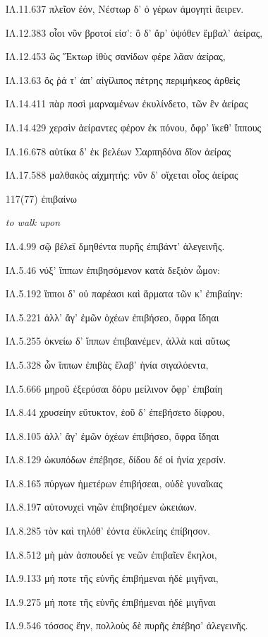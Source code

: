 \begin{enumerate}
{ΙΛ.11.637 πλεῖον ἐόν, Νέστωρ δ' ὁ γέρων ἀμογητὶ ἄειρεν.

ΙΛ.12.383 οἷοι νῦν βροτοί εἰσ': ὃ δ' ἄρ' ὑψόθεν ἔμβαλ' ἀείρας,

ΙΛ.12.453 ὣς Ἕκτωρ ἰθὺς σανίδων φέρε λᾶαν ἀείρας,

ΙΛ.13.63 ὅς ῥά τ' ἀπ' αἰγίλιπος πέτρης περιμήκεος ἀρθεὶς

ΙΛ.14.411 πὰρ ποσὶ μαρναμένων ἐκυλίνδετο, τῶν ἓν ἀείρας

ΙΛ.14.429 χερσὶν ἀείραντες φέρον ἐκ πόνου, ὄφρ' ἵκεθ' ἵππους

ΙΛ.16.678 αὐτίκα δ' ἐκ βελέων Σαρπηδόνα δῖον ἀείρας

ΙΛ.17.588 μαλθακὸς αἰχμητής: νῦν δ' οἴχεται οἶος ἀείρας

}

\clearpage
\item[\large 117(77)]{\large \g ἐπιβαίνω}

\hspace{0.2cm} \textit{ to walk upon }

{\g
ΙΛ.4.99 σῷ βέλεϊ δμηθέντα πυρῆς ἐπιβάντ' ἀλεγεινῆς.

ΙΛ.5.46 νύξ' ἵππων ἐπιβησόμενον κατὰ δεξιὸν ὦμον:

ΙΛ.5.192 ἵπποι δ' οὐ παρέασι καὶ ἅρματα τῶν κ' ἐπιβαίην:

ΙΛ.5.221 ἀλλ' ἄγ' ἐμῶν ὀχέων ἐπιβήσεο, ὄφρα ἴδηαι

ΙΛ.5.255 ὀκνείω δ' ἵππων ἐπιβαινέμεν, ἀλλὰ καὶ αὔτως

ΙΛ.5.328 ὧν ἵππων ἐπιβὰς ἔλαβ' ἡνία σιγαλόεντα,

ΙΛ.5.666 μηροῦ ἐξερύσαι δόρυ μείλινον ὄφρ' ἐπιβαίη

ΙΛ.8.44 χρυσείην εὔτυκτον, ἑοῦ δ' ἐπεβήσετο δίφρου,

ΙΛ.8.105 ἀλλ' ἄγ' ἐμῶν ὀχέων ἐπιβήσεο, ὄφρα ἴδηαι

ΙΛ.8.129 ὠκυπόδων ἐπέβησε, δίδου δέ οἱ ἡνία χερσίν.

ΙΛ.8.165 πύργων ἡμετέρων ἐπιβήσεαι, οὐδὲ γυναῖκας

ΙΛ.8.197 αὐτονυχεὶ νηῶν ἐπιβησέμεν ὠκειάων.

ΙΛ.8.285 τὸν καὶ τηλόθ' ἐόντα ἐϋκλείης ἐπίβησον.

ΙΛ.8.512 μὴ μὰν ἀσπουδεί γε νεῶν ἐπιβαῖεν ἕκηλοι,

ΙΛ.9.133 μή ποτε τῆς εὐνῆς ἐπιβήμεναι ἠδὲ μιγῆναι,

ΙΛ.9.275 μή ποτε τῆς εὐνῆς ἐπιβήμεναι ἠδὲ μιγῆναι

ΙΛ.9.546 τόσσος ἔην, πολλοὺς δὲ πυρῆς ἐπέβησ' ἀλεγεινῆς.

}
\end{enumerate}
